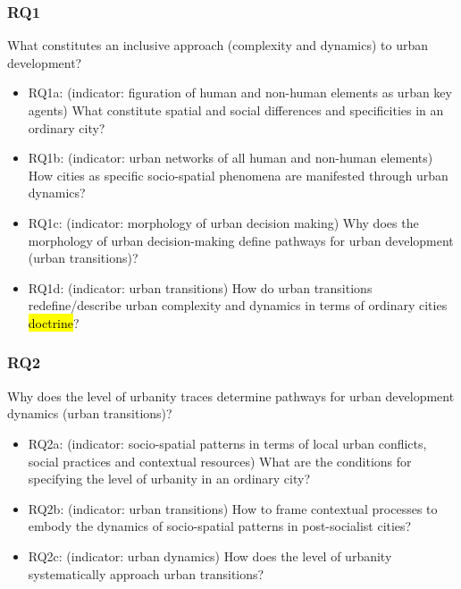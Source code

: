 \documentclass[11pt]{report}
\begin{document}
\subsubsection{RQ1}
What constitutes an inclusive approach (complexity and dynamics) to urban development?
\begin{itemize}
\item RQ1a: (indicator: figuration of human and non-human elements as urban key agents) What constitute spatial and social differences and specificities in an ordinary city? 
\item RQ1b: (indicator: urban networks of all human and non-human elements) How cities as specific socio-spatial phenomena are manifested through urban dynamics?
\item RQ1c: (indicator: morphology of urban decision making) Why does the morphology of urban decision-making define pathways for urban development (urban transitions)?
\item RQ1d: (indicator: urban transitions) How do urban transitions redefine/describe urban complexity and dynamics in terms of ordinary cities \hl{doctrine}?
\end {itemize}

\subsubsection{RQ2}
Why does the level of urbanity traces determine pathways for urban development dynamics (urban transitions)? 
\begin{itemize}
\item RQ2a: (indicator: socio-spatial patterns in terms of local urban conflicts, social practices and contextual resources) What are the conditions for specifying the level of urbanity in an ordinary city?
\item RQ2b: (indicator:  urban transitions) How to frame contextual processes to embody the dynamics of socio-spatial patterns in post-socialist cities?
\item RQ2c: (indicator: urban dynamics) How does the level of urbanity systematically approach urban transitions?
\end {itemize}
\end{document}
